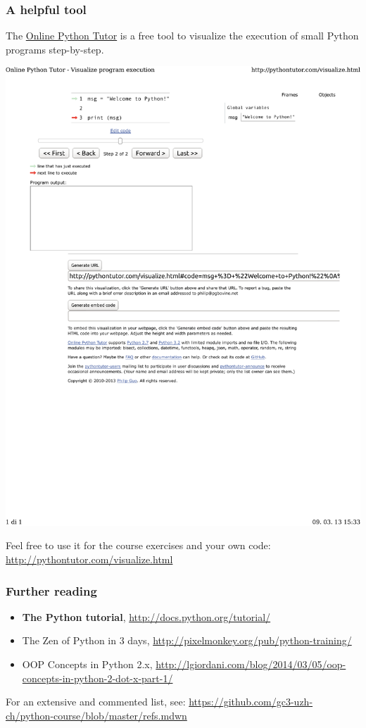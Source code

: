 \documentclass[english,serif,mathserif,xcolor=pdftex,dvipsnames,table]{beamer}
\begin{document}
\begin{frame}
  \frametitle{A helpful tool}

  The \href{http://pythontutor.com}{Online Python Tutor} is a free
  tool to visualize the execution of small Python programs
  step-by-step.

  \+
  \href{http://tinyurl.com/cf5ftwr}{%
    \centering
    \includegraphics[width=1.0\linewidth,viewport=0 600 500 750,clip]{fig/pythontutor}
  }

  \+ Feel free to use it for the course exercises and your own code:
  \url{http://pythontutor.com/visualize.html}
\end{frame}

\begin{frame}
  \frametitle{Further reading}

  \begin{itemize}
    \item \textbf{The Python tutorial},
      {\small \url{http://docs.python.org/tutorial/}}
    \item {The Zen of Python in 3 days},
      {\small \url{http://pixelmonkey.org/pub/python-training/}}
    \item {OOP Concepts in Python 2.x},
      {\small \url{http://lgiordani.com/blog/2014/03/05/oop-concepts-in-python-2-dot-x-part-1/}}
  \end{itemize}

  \+   For an extensive and commented list, see:
  {\footnotesize\url{https://github.com/gc3-uzh-ch/python-course/blob/master/refs.mdwn}}

\end{frame}
\end{document}
